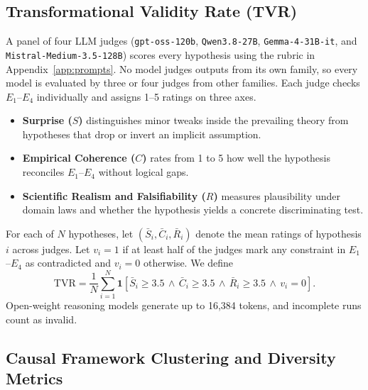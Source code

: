 \documentclass{article}
\begin{document}
\subsection{Transformational Validity Rate (TVR)}

A panel of four LLM judges (\texttt{gpt-oss-120b}, \texttt{Qwen3.8-27B}, \texttt{Gemma-4-31B-it}, and \texttt{Mistral-Medium-3.5-128B}) scores every hypothesis using the rubric in Appendix~\ref{app:prompts}. No model judges outputs from its own family, so every model is evaluated by three or four judges from other families. Each judge checks $E_1$--$E_4$ individually and assigns 1--5 ratings on three axes.
\begin{itemize}[leftmargin=1.5em, itemsep=0pt, topsep=1pt]
\item \textbf{Surprise ($S$)} distinguishes minor tweaks inside the prevailing theory from hypotheses that drop or invert an implicit assumption.
\item \textbf{Empirical Coherence ($C$)} rates from 1 to 5 how well the hypothesis reconciles $E_1$--$E_4$ without logical gaps.
\item \textbf{Scientific Realism and Falsifiability ($R$)} measures plausibility under domain laws and whether the hypothesis yields a concrete discriminating test.
\end{itemize}
For each of $N$ hypotheses, let $(\bar{S}_i, \bar{C}_i, \bar{R}_i)$ denote the mean ratings of hypothesis $i$ across judges. Let $v_i = 1$ if at least half of the judges mark any constraint in $E_1$--$E_4$ as contradicted and $v_i = 0$ otherwise. We define
\begin{equation}
\mathrm{TVR} = \frac{1}{N}\sum_{i=1}^{N} \mathbf{1}\!\left[\bar{S}_i \ge 3.5 \,\land\, \bar{C}_i \ge 3.5 \,\land\, \bar{R}_i \ge 3.5 \,\land\, v_i = 0\right].
\end{equation}
Open-weight reasoning models generate up to 16,384 tokens, and incomplete runs count as invalid.

\subsection{Causal Framework Clustering and Diversity Metrics}
\end{document}
